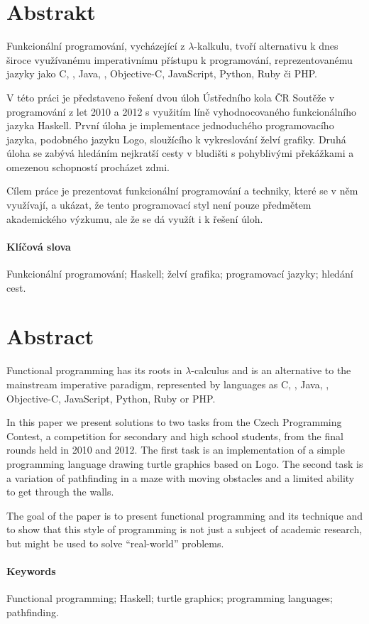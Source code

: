 \begin{adjustwidth}{1.5cm}{1.5cm}


\section*{Abstrakt}

Funkcionální programování, vycházející z $\lambda$-kalkulu, tvoří alternativu k
dnes široce využívanému imperativnímu přístupu k programování, reprezentovanému
jazyky jako C, \Cplusplus{}, Java, \Csh{}, Objective-C, JavaScript, Python, Ruby
či PHP.

V této práci je představeno řešení dvou úloh Ústředního kola ČR Soutěže v
programování z let 2010 a 2012 s využitím líně vyhodnocovaného funkcionálního
jazyka Haskell. První úloha je implementace jednoduchého programovacího jazyka,
podobného jazyku Logo, sloužícího k vykreslování želví grafiky. Druhá úloha se
zabývá hledáním nejkratší cesty v bludišti s pohyblivými překážkami a omezenou
schopností procházet zdmi.

Cílem práce je prezentovat funkcionální programování a techniky, které se v něm
využívají, a ukázat, že tento programovací styl není pouze předmětem
akademického výzkumu, ale že se dá využít i k řešení  úloh.

\paragraph*{Klíčová slova}
Funkcionální programování; Haskell; želví grafika; programovací jazyky; hledání
cest.

\section*{Abstract}

Functional programming has its roots in $\lambda$-calculus and is an alternative
to the mainstream imperative paradigm, represented by languages as C,
\Cplusplus{}, Java, \Csh{}, Objective-C, JavaScript, Python, Ruby or PHP.

In this paper we present solutions to two tasks from the Czech Programming
Contest, a competition for secondary and high school students, from the final
rounds held in 2010 and 2012. The first task is an implementation of a simple
programming language drawing turtle graphics based on Logo. The second task is a
variation of pathfinding in a maze with moving obstacles and a limited ability
to get through the walls.

The goal of the paper is to present functional programming and its technique and
to show that this style of programming is not just a subject of academic
research, but might be used to solve ``real-world'' problems.

\paragraph*{Keywords}
Functional programming; Haskell; turtle graphics; programming languages;
pathfinding.

\end{adjustwidth}
